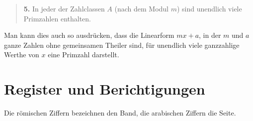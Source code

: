 \documentclass[11pt]{article}
\begin{document}
\begin{quote}
\textbf{5.} In jeder der Zahlclassen $A$ (nach dem Modul $m$) sind unendlich viele Primzahlen enthalten.
\end{quote}

Man kann dies auch so ausdrücken, dass die Linearform $mx+a$, in der $m$ und $a$ ganze Zahlen ohne gemeinsamen Theiler sind, für unendlich viele ganzzahlige Werthe von $x$ eine Primzahl darstellt.

\clearpage
\section*{Register und Berichtigungen}
\begin{center}\small Die römischen Ziffern bezeichnen den Band, die arabischen Ziffern die Seite.\end{center}
\end{document}
